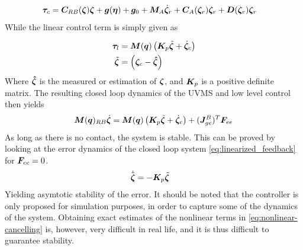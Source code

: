 \begin{align}
\boldsymbol	\tau_{c} &=
  \boldsymbol C_{RB}(\boldsymbol \zeta)\boldsymbol \zeta + \boldsymbol g(\boldsymbol \eta) + \boldsymbol g_0 + \boldsymbol M_A \dot{\boldsymbol \zeta}_r  + \boldsymbol C_A(\boldsymbol \zeta_r) \boldsymbol \zeta_r + \boldsymbol D(\boldsymbol \zeta_r) \boldsymbol \zeta_r 
	\label{eq:nonlinear-cancelling}
\end{align}
While the linear control term is simply given as

\begin{align}
	\boldsymbol \tau_{l} & =\boldsymbol M(\boldsymbol q) \left(\boldsymbol K_{p} \tilde{\boldsymbol \zeta} + \dot{\boldsymbol \zeta}_{c} \right) \\
	\label{eq:linfeedback-lin}
	\tilde{\boldsymbol \zeta} &=\left(\boldsymbol \zeta_{c} - \boldsymbol{ \hat \zeta } \right)
\end{align}
Where $\boldsymbol{ \hat \zeta } $ is the measured or estimation of $\boldsymbol \zeta$, and $\boldsymbol K_{p}$ is a positive definite matrix. The resulting closed loop dynamics of the UVMS and low level control then yields
\begin{align}
	\boldsymbol M(\boldsymbol q)_{RB}\dot{\boldsymbol \zeta} =\boldsymbol M(\boldsymbol q) \left(\boldsymbol K_{p} \tilde{\boldsymbol \zeta} + \dot{\boldsymbol \zeta}_{c} \right) + (\boldsymbol J_{ge}^B)^T \boldsymbol F_{ee}
	\label{eq:linearized_feedback}
\end{align}
As long as there is no contact, the system is stable. This can be proved by looking at the error dynamics of the closed loop system \eqref{eq:linearized_feedback} for $\boldsymbol F_{ee}=0$.
\begin{align}
	\dot{\tilde{\boldsymbol \zeta}} & =- \boldsymbol K_{p} \tilde{\boldsymbol \zeta} 
	\label{eq:errordynamics}
\end{align}
Yielding asymtotic stability of the error.
It should be noted that the controller is only proposed for simulation purposes, in order to capture some of the dynamics of the system. Obtaining exact estimates of the nonlinear terms in \eqref{eq:nonlinear-cancelling} is, however, very difficult in real life, and it is thus difficult to guarantee stability.











